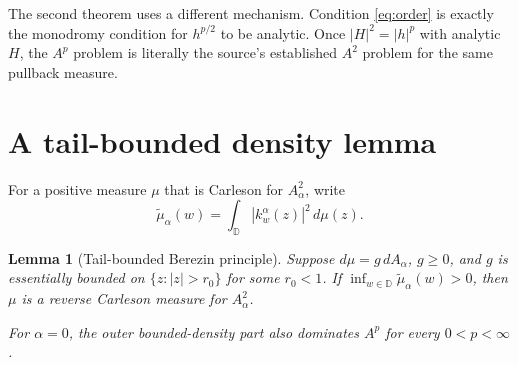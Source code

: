 \documentclass[11pt]{article}
\newtheorem{lemma}[theorem]{Lemma}
\newcommand{\D}{\mathbb D}
\begin{document}
The second theorem uses a different mechanism.  Condition \eqref{eq:order}
is exactly the monodromy condition for $h^{p/2}$ to be analytic.  Once
$|H|^2=|h|^p$ with analytic $H$, the $A^p$ problem is literally the source's
established $A^2$ problem for the same pullback measure.

\section{A tail-bounded density lemma}

For a positive measure $\mu$ that is Carleson for $A^2_\alpha$, write
\[
 \widetilde\mu_\alpha(w)
   =\int_\D |k_w^\alpha(z)|^2\,d\mu(z).
\]

\begin{lemma}[Tail-bounded Berezin principle]\label{lem:tail}
Suppose $d\mu=g\,dA_\alpha$, $g\ge0$, and $g$ is essentially bounded on
$\{z:|z|>r_0\}$ for some $r_0<1$.  If
$\inf_{w\in\D}\widetilde\mu_\alpha(w)>0$, then $\mu$ is a reverse
Carleson measure for $A^2_\alpha$.

For $\alpha=0$, the outer bounded-density part also dominates $A^p$ for
every $0<p<\infty$.
\end{lemma}
\end{document}
